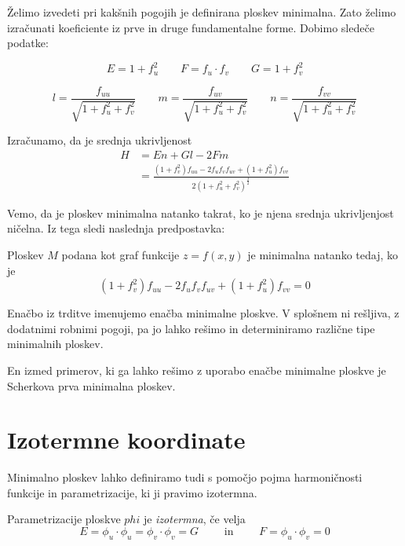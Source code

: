 \documentclass[mat1]{fmfdelo}
\begin{document}
Želimo izvedeti pri kakšnih pogojih je definirana ploskev minimalna. Zato želimo izračunati koeficiente iz prve in druge fundamentalne forme.
Dobimo sledeče podatke:

$$ E = 1 + f_u^2 \qquad 
F = f_u \cdot f_v \qquad 
G = 1 + f_v^2 $$

$$ l = \frac{f_{uu}}{\sqrt{1 + f_u^2 + f_v^2}} \qquad 
m = \frac{f_{uv}}{\sqrt{1 + f_u^2 + f_v^2}} \qquad
n = \frac{f_{vv}}{\sqrt{1 + f_u^2 + f_v^2}} $$

Izračunamo, da je srednja ukrivljenost 
\begin{align*}
    H &= E n + G l - 2 F m \\
    &= \frac{ (1 + f_v^2) f_{uu} - 2 f_u f_v f_{uv} + (1 + f_u^2) f_{vv} }{ 2 (1 + f_u^2 + f_v^2)^{\frac{3}{2}} }
\end{align*} 

Vemo, da je ploskev minimalna natanko takrat, ko je njena srednja ukrivljenjost ničelna. Iz tega sledi naslednja 
predpostavka:

\begin{trditev}
    Ploskev $M$ podana kot graf funkcije $z = f(x, y)$ je minimalna natanko tedaj, ko je
    $$ (1 + f_v^2) f_{uu} - 2 f_u f_v f_{uv} + (1 + f_u^2) f_{vv} = 0 $$
\end{trditev}

Enačbo iz trditve imenujemo enačba minimalne ploskve. V splošnem ni rešljiva, z dodatnimi robnimi pogoji, pa jo lahko rešimo in
determiniramo različne tipe minimalnih ploskev.

En izmed primerov, ki ga lahko rešimo z uporabo enačbe minimalne ploskve je Scherkova prva minimalna ploskev. 

\begin{primer}
\end{primer}



\section{Izotermne koordinate}
Minimalno ploskev lahko definiramo tudi s pomočjo pojma harmoničnosti funkcije in parametrizacije, ki ji pravimo izotermna.

\begin{definicija}
    Parametrizacije ploskve $phi$ je \emph{izotermna}, če velja $$ E = \phi_u \cdot \phi_u = \phi_v \cdot \phi_v = G \qquad \text{ in } \qquad F = \phi_u \cdot \phi_v = 0 $$ 
\end{definicija}
\end{document}
